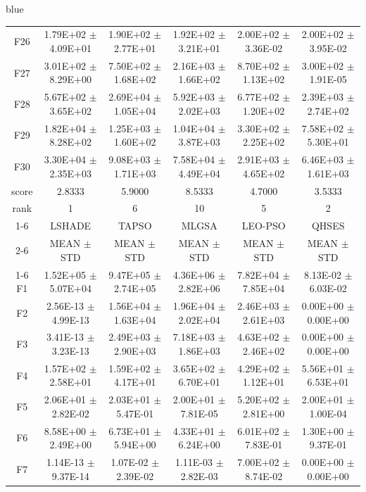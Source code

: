 \documentclass[journal, onecolumn]{IEEEtran}
\begin{document}
\begin{color}{blue}
\begin{table}[htbp!]
\begin{tabular}{c|ccccc}
			F26	 &	1.79E+02	$\pm$	4.09E+01	 &	1.90E+02	$\pm$	2.77E+01		 &	1.92E+02	$\pm$	3.21E+01		 &	2.00E+02	$\pm$	3.36E-02		 &	2.00E+02	$\pm$	3.95E-02	\\		
			F27	 &	3.01E+02	$\pm$	8.29E+00	 &	7.50E+02	$\pm$	1.68E+02		 &	2.16E+03	$\pm$	1.66E+02		 &	8.70E+02	$\pm$	1.13E+02		 &	3.00E+02	$\pm$	1.91E-05	\\		
			F28	 &	5.67E+02	$\pm$	3.65E+02	 &	2.69E+04	$\pm$	1.05E+04		 &	5.92E+03	$\pm$	2.02E+03		 &	6.77E+02	$\pm$	1.20E+02		 &	2.39E+03	$\pm$	2.74E+02	\\		
			F29	 &	1.82E+04	$\pm$	8.28E+02	 &	1.25E+03	$\pm$	1.60E+02		 &	1.04E+04	$\pm$	3.87E+03		 &	3.30E+02	$\pm$	2.25E+02		 &	7.58E+02	$\pm$	5.30E+01	\\		
			F30	 &	3.30E+04	$\pm$	2.35E+03	 &	9.08E+03	$\pm$	1.71E+03		 &	7.58E+04	$\pm$	4.49E+04		 &	2.91E+03	$\pm$	4.65E+02		 &	6.46E+03	$\pm$	1.61E+03	\\		\hline
			score		& 2.8333 & 5.9000 & 8.5333 & 4.7000 & 3.5333											\\													
			rank	 	& 1 & 6 & 10 & 5 & 2											\\	\cline{1-6}												
			&	LSHADE				 &	TAPSO				 &	MLGSA				 &	LEO-PSO				 &	QHSES			\\	\cline{2-6}	
			&	MEAN	$\pm$	STD		 &	MEAN	$\pm$	STD		 &	MEAN	$\pm$	STD		 &	MEAN	$\pm$	STD		 &	MEAN	$\pm$	STD	\\	\cline{1-6}
			F1	 &	1.52E+05	$\pm$	5.07E+04		 &	9.47E+05	$\pm$	2.74E+05		 &	4.36E+06	$\pm$	2.82E+06		 &	7.82E+04	$\pm$	7.85E+04		 &	8.13E-02	$\pm$	6.03E-02	\\	
			F2	 &	2.56E-13	$\pm$	4.99E-13		 &	1.56E+04	$\pm$	1.63E+04		 &	1.96E+04	$\pm$	2.02E+04		 &	2.46E+03	$\pm$	2.61E+03		 &	0.00E+00	$\pm$	0.00E+00	\\	
			F3	 &	3.41E-13	$\pm$	3.23E-13		 &	2.49E+03	$\pm$	2.90E+03		 &	7.18E+03	$\pm$	1.86E+03		 &	4.63E+02	$\pm$	2.46E+02		 &	0.00E+00	$\pm$	0.00E+00	\\	
			F4	 &	1.57E+02	$\pm$	2.58E+01		 &	1.59E+02	$\pm$	4.17E+01		 &	3.65E+02	$\pm$	6.70E+01		 &	4.29E+02	$\pm$	1.12E+01		 &	5.56E+01	$\pm$	6.53E+01	\\	
			F5	 &	2.06E+01	$\pm$	2.82E-02		 &	2.03E+01	$\pm$	5.47E-01		 &	2.00E+01	$\pm$	7.81E-05		 &	5.20E+02	$\pm$	2.81E+00		 &	2.00E+01	$\pm$	1.00E-04	\\	
			F6	 &	8.58E+00	$\pm$	2.49E+00		 &	6.73E+01	$\pm$	5.94E+00		 &	4.33E+01	$\pm$	6.24E+00		 &	6.01E+02	$\pm$	7.83E-01		 &	1.30E+00	$\pm$	9.37E-01	\\	
			F7	 &	1.14E-13	$\pm$	9.37E-14		 &	1.07E-02	$\pm$	2.39E-02		 &	1.11E-03	$\pm$	2.82E-03		 &	7.00E+02	$\pm$	8.74E-02		 &	0.00E+00	$\pm$	0.00E+00	\\	

\end{tabular}
\end{table}
\end{color}
\end{document}
